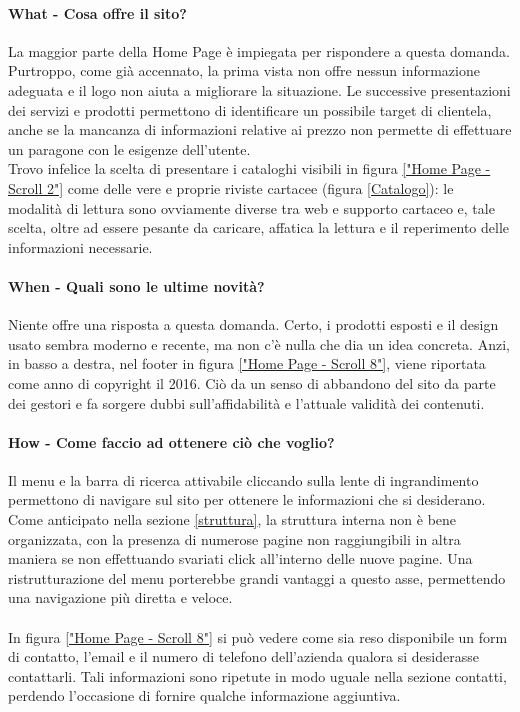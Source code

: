 \paragraph{What - Cosa offre il sito?}
La maggior parte della Home Page è impiegata per rispondere a questa domanda. Purtroppo, come già accennato, la prima vista non offre nessun informazione adeguata e il logo non aiuta a migliorare la situazione.
Le successive presentazioni dei servizi e prodotti permettono di identificare un possibile target di clientela, anche se la mancanza di informazioni relative ai prezzo non permette di effettuare un paragone con le esigenze dell'utente.\\
Trovo infelice la scelta di presentare i cataloghi visibili in figura \ref{"Home Page - Scroll 2"} come delle vere e proprie riviste cartacee (figura \ref{Catalogo}): le modalità di lettura sono ovviamente diverse tra web e supporto cartaceo e, tale scelta, oltre ad essere pesante da caricare, affatica la lettura e il reperimento delle informazioni necessarie.

\paragraph{When - Quali sono le ultime novità?}
Niente offre una risposta a questa domanda. Certo, i prodotti esposti e il design usato sembra moderno e recente, ma non c'è nulla che dia un idea concreta. Anzi, in basso a destra, nel footer in figura \ref{"Home Page - Scroll 8"}, viene riportata come anno di copyright il 2016. Ciò da un senso di abbandono del sito da parte dei gestori e fa sorgere dubbi sull'affidabilità e l'attuale validità dei contenuti.
 
\paragraph{How - Come faccio ad ottenere ciò che voglio?}
Il menu e la barra di ricerca attivabile cliccando sulla lente di ingrandimento permettono di navigare sul sito per ottenere le informazioni che si desiderano. Come anticipato nella sezione \ref{struttura}, la struttura interna non è bene organizzata, con la presenza di numerose pagine non raggiungibili in altra maniera se non effettuando svariati click all'interno delle nuove pagine. Una ristrutturazione del menu porterebbe grandi vantaggi a questo asse, permettendo una navigazione più diretta e veloce. \\ \\ In figura \ref{"Home Page - Scroll 8"} si può vedere come sia reso disponibile un form di contatto, l'email e il numero di telefono dell'azienda qualora si desiderasse contattarli. Tali informazioni sono ripetute in modo uguale nella sezione contatti, perdendo l'occasione di fornire qualche informazione aggiuntiva.

